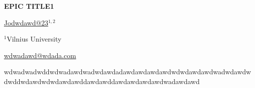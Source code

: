 \documentclass[12pt, twoside, a4paper, hidelinks]{article}
\begin{document}
    \begin{center} \MakeUppercase{ {\large \textbf{Epic title1}}} \end{center}
    \vspace{-0.8cm}\begin{center} \underline{Jodwdawd@23}$^{1,2}$ \end{center}
    \vspace{-.5cm}

    \begin{center} {\small $^{1}$Vilnius University
        
        \underline{wdwadawd@wdada.com}
    } \end{center}

    wdwadwadwddwdwadawdwadwdawdadawdawdawdawdwdwdawdawdwadwdawdwdwddwdawdwdwdawdawddawdawddawdawdawdawdwadawdawd
    
\end{document}
